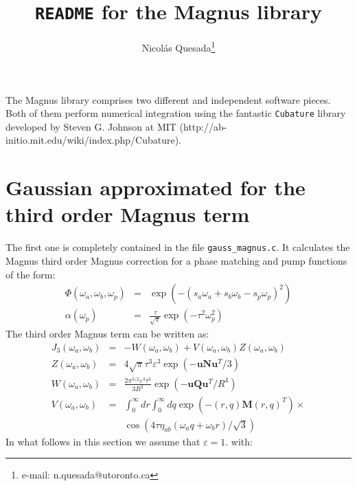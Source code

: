 \documentclass[10pt,letterpaper]{article}
\title{\texttt{README} for the Magnus library}
\author{Nicol\'as Quesada\footnote{e-mail: n.quesada@utoronto.ca}}
\begin{document}
\maketitle



The Magnus library comprises two different and independent software pieces. Both of them perform numerical integration using the fantastic \verb|Cubature| library developed by Steven G. Johnson at MIT (http://ab-initio.mit.edu/wiki/index.php/Cubature).\\
\section{Gaussian approximated for the third order Magnus term}
The first one is completely contained in the file \verb|gauss_magnus.c|. It calculates the Magnus third order Magnus correction for a phase matching and pump functions of the form:
\begin{eqnarray}
\Phi(\omega_a,\omega_b,\omega_p)&=&\exp(-(s_a \omega_a+s_b \omega_b-s_p \omega_p)^2)\\
\alpha(\omega_p)&=&\frac{\tau}{\sqrt{\pi}} \exp(-\tau^2 \omega_p^2)
\end{eqnarray}
The third order Magnus term can be written as:
\begin{eqnarray}\label{J_3}
J_3(\omega_a,\omega_b)&=&-W(\omega_a,\omega_b)+V(\omega_a,\omega_b) Z(\omega_a,\omega_b)\\
Z(\omega_a,\omega_b)&=&4\sqrt{\pi} \tau^3 \varepsilon^3 \exp\left(-\mathbf{u} \mathbf{N} \mathbf{u}^T/3\right)\\
W(\omega_a,\omega_b)&=&\frac{2\pi^{3/2} \varepsilon^3 \tau^3}{3 R^2} \exp\left(-\mathbf{u}\mathbf{Q}\mathbf{u}^T/R^4 \right)\\
V(\omega_a,\omega_b)&=& \int_0^{\infty} dr \int_0^{\infty} dq \exp\left(-(r,q) \mathbf{M} (r,q)^T \right) \times \nonumber\\
&&\cos\left(4 \tau \eta_{ab}( \omega_a q+ \omega_b r)/\sqrt{3}  \right)\nonumber
\end{eqnarray}
In what follows in this section we assume that $\varepsilon=1$.
with:
\end{document}
